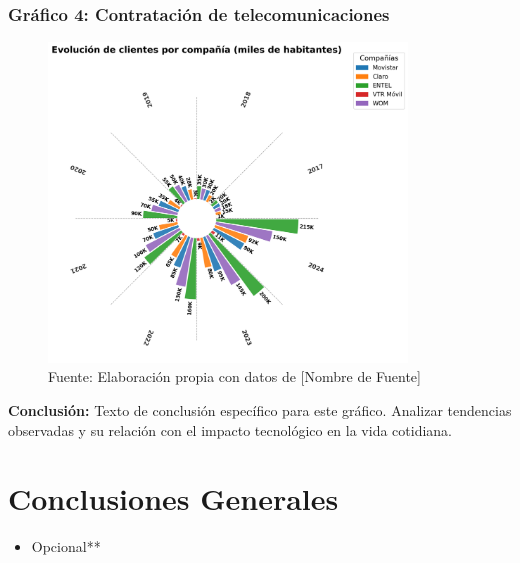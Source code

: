 \documentclass[12pt, a4paper]{article}
\begin{document}
\subsubsection*{Gráfico 4: Contratación de telecomunicaciones}
\begin{figure}[H]
    \centering
    \includegraphics[width=0.85\textwidth]{images/graph2_JG.png}
    \caption{Fuente: Elaboración propia con datos de [Nombre de Fuente]}
\end{figure}

\textbf{Conclusión:}  
Texto de conclusión específico para este gráfico. Analizar tendencias observadas y su relación con el impacto tecnológico en la vida cotidiana.


\section*{Conclusiones Generales}
\begin{itemize}
    \item Opcional**
\end{itemize}
\end{document}
